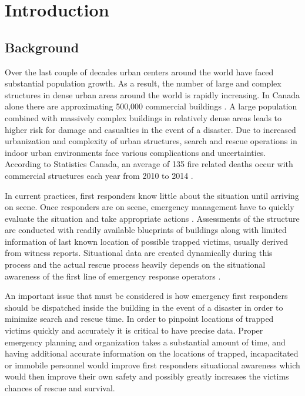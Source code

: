 

\setcounter{section}{0}
\section{Introduction}
\bigskip

\subsection{Background}
Over the last couple of decades urban centers around the world have faced substantial population growth. As a result, the number of large and complex structures in dense urban areas around the world is rapidly increasing. In Canada alone there are approximating 500,000 commercial buildings \cite{R1}. A large population combined with massively complex buildings in relatively dense areas leads to higher risk for damage and casualties in the event of a disaster. Due to increased urbanization and complexity of urban structures, search and rescue operations in indoor urban environments face various complications and uncertainties. According to Statistics Canada, an average of 135 fire related deaths occur with commercial structures each year from 2010 to 2014 \cite{R2}.

\bigskip
In current practices, first responders know little about the situation until arriving on scene. Once responders are on scene, emergency management have to quickly evaluate the situation and take appropriate actions \cite{R3}.  Assessments of the structure are conducted with readily available blueprints of buildings along with limited information of last known location of possible trapped victims, usually derived from witness reports. Situational data are created dynamically during this process and the actual rescue process heavily depends on the situational awareness of the first line of emergency response operators \cite{R4}.

\bigskip
An important issue that must be considered is how emergency first responders should be dispatched inside the building in the event of a disaster in order to minimize search and rescue time. In order to pinpoint locations of trapped victims quickly and accurately it is critical to have precise data. Proper emergency planning and organization takes a substantial amount of time, and having additional accurate information on the locations of trapped, incapacitated or immobile personnel would improve first responders situational awareness which would then improve their own safety and possibly greatly increases the victims chances of rescue and survival.

